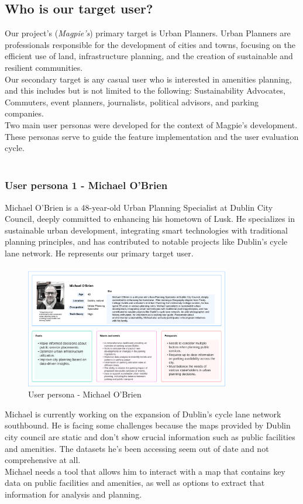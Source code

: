 \subsection{Who is our target user?}
Our project's (\textit{Magpie's}) primary target is Urban Planners. Urban
Planners are professionals responsible for the development of cities and towns,
focusing on the efficient use of land, infrastructure planning, and the creation
of sustainable and resilient communities. \\
Our secondary target is any casual user who is interested in amenities planning, and this includes but is not limited to the following: Sustainability Advocates, Commuters, event planners, journalists, political advisors, and parking companies.\\

Two main user personas were developed for the context of Magpie's development. \\
These personas serve to guide the feature implementation and the user evaluation cycle.\\ \\

\subsubsection{User persona 1 - Michael O'Brien}
\noindent Michael O'Brien is a 48-year-old Urban Planning Specialist at Dublin City Council, deeply committed to enhancing his hometown of Lusk. He specializes in sustainable urban development, integrating smart technologies with traditional planning principles, and has contributed to notable projects like Dublin's cycle lane network. He represents our primary target user.
\begin{figure}[h!]
    \centering
    \includegraphics[width=0.8\textwidth]{images/michael-obrien-userpersona.png}
    \caption{User persona - Michael O'Brien}
\end{figure}
Michael is currently working on the expansion of Dublin's cycle lane network southbound. He is facing some challenges because the maps provided by Dublin city council are static and don't show crucial information such as public facilities and amenities. The datasets he's been accessing seem out of date and not comprehensive at all.\\
Michael needs a tool that allows him to interact with a map that contains key data on public facilities and amenities, as well as options to extract that information for analysis and planning.\\

